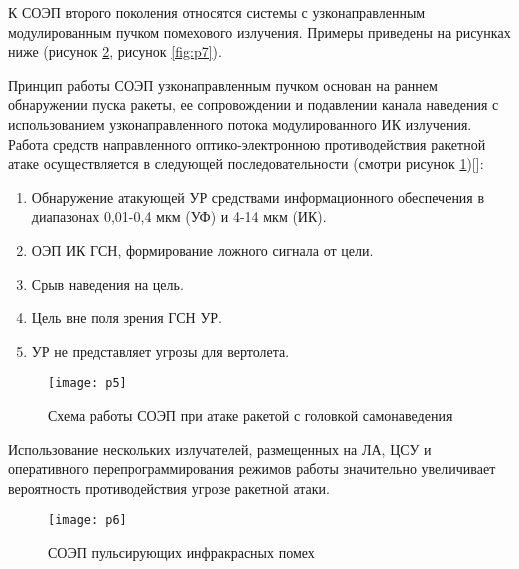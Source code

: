 К СОЭП второго поколения относятся системы с узконаправленным модулированным пучком помехового излучения. Примеры приведены на рисунках ниже (рисунок \ref{fig:p6}, рисунок \ref{fig:p7}).

Принцип работы СОЭП узконаправленным пучком основан на раннем обнаружении пуска ракеты, ее сопровождении и подавлении канала наведения с использованием узконаправленного потока модулированного ИК излучения.  Работа средств направленного оптико-электронною противодействия ракетной атаке осуществляется в следующей последовательности (смотри рисунок \ref{fig:p5})[]:

\begin{enumerate}
	\item Обнаружение атакующей УР средствами информационного обеспечения в диапазонах 0,01-0,4 мкм (УФ) и 4-14 мкм (ИК).
	\item ОЭП ИК ГСН, формирование ложного сигнала от цели. 
	\item Срыв наведения на цель. 
	\item Цель вне поля зрения ГСН УР. 
	\item УР не представляет угрозы для вертолета.	
\end{enumerate}

\begin{figure}[ht]
	\centering
	\texttt{[image: p5]} 
	\caption{Схема работы СОЭП при атаке ракетой с головкой самонаведения}
	\label{fig:p5}
\end{figure}

Использование нескольких излучателей, размещенных на ЛА, ЦСУ и оперативного перепрограммирования режимов работы значительно увеличивает вероятность противодействия угрозе ракетной атаки.

\begin{figure}[ht]
	\centering
	\texttt{[image: p6]} 
	\caption{СОЭП пульсирующих инфракрасных помех}
	\label{fig:p6}
\end{figure}

